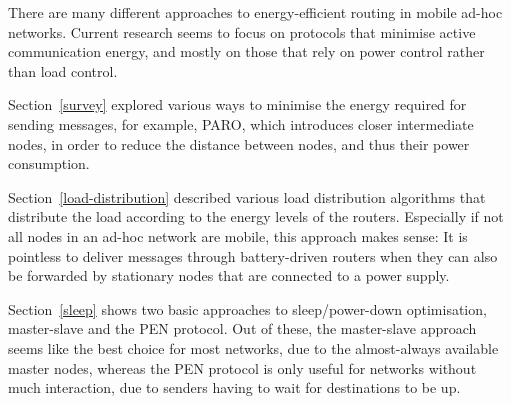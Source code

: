 There are many different approaches to energy-efficient routing in
mobile ad-hoc networks. Current research seems to focus on protocols
that minimise active communication energy, and mostly on those that
rely on power control rather than load control.

Section~\ref{survey} explored various ways to minimise the energy required for sending
messages, for example, PARO, which introduces closer intermediate nodes,
in order to reduce the distance between nodes, and thus their
power consumption.

Section~\ref{load-distribution} described various load distribution algorithms that distribute
the load according to the energy levels of the routers. Especially if not all
nodes in an ad-hoc network are mobile, this approach makes sense: It is
pointless to deliver messages through battery-driven routers when they can
also be forwarded by stationary nodes that are connected to a power supply.

Section~\ref{sleep} shows two basic approaches to sleep/power-down optimisation, master-slave
and the PEN protocol. Out of these, the master-slave approach seems like the
best choice for most networks, due to the almost-always available master nodes,
whereas the PEN protocol is only useful for networks without much interaction,
due to senders having to wait for destinations to be up.
